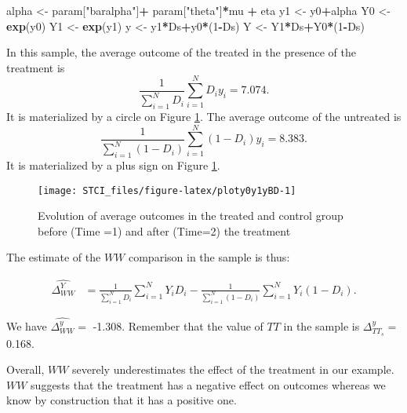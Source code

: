 \documentclass[]{book}
\newenvironment{Shaded}{\begin{snugshade}}{\end{snugshade}}
\newcommand{\KeywordTok}[1]{\textcolor[rgb]{0.13,0.29,0.53}{\textbf{#1}}}
\newcommand{\DecValTok}[1]{\textcolor[rgb]{0.00,0.00,0.81}{#1}}
\newcommand{\StringTok}[1]{\textcolor[rgb]{0.31,0.60,0.02}{#1}}
\newcommand{\OperatorTok}[1]{\textcolor[rgb]{0.81,0.36,0.00}{\textbf{#1}}}
\newcommand{\NormalTok}[1]{#1}
\theoremstyle{definition}
\theoremstyle{definition}
\theoremstyle{definition}
\theoremstyle{remark}
\begin{document}
\begin{Shaded}
\begin{Highlighting}[]
\NormalTok{alpha <-}\StringTok{ }\NormalTok{param[}\StringTok{"baralpha"}\NormalTok{]}\OperatorTok{+}\StringTok{  }\NormalTok{param[}\StringTok{"theta"}\NormalTok{]}\OperatorTok{*}\NormalTok{mu }\OperatorTok{+}\StringTok{ }\NormalTok{eta}
\NormalTok{y1 <-}\StringTok{ }\NormalTok{y0}\OperatorTok{+}\NormalTok{alpha}
\NormalTok{Y0 <-}\StringTok{ }\KeywordTok{exp}\NormalTok{(y0)}
\NormalTok{Y1 <-}\StringTok{ }\KeywordTok{exp}\NormalTok{(y1)}
\NormalTok{y <-}\StringTok{ }\NormalTok{y1}\OperatorTok{*}\NormalTok{Ds}\OperatorTok{+}\NormalTok{y0}\OperatorTok{*}\NormalTok{(}\DecValTok{1}\OperatorTok{-}\NormalTok{Ds)}
\NormalTok{Y <-}\StringTok{ }\NormalTok{Y1}\OperatorTok{*}\NormalTok{Ds}\OperatorTok{+}\NormalTok{Y0}\OperatorTok{*}\NormalTok{(}\DecValTok{1}\OperatorTok{-}\NormalTok{Ds)}
\end{Highlighting}
\end{Shaded}

In this sample, the average outcome of the treated in the presence of
the treatment is \[
\frac{1}{\sum_{i=1}^ND_i}\sum_{i=1}^ND_iy_i= 7.074.
\] It is materialized by a circle on Figure \ref{fig:ploty0y1yBD}. The
average outcome of the untreated is \[
\frac{1}{\sum_{i=1}^N(1-D_i)}\sum_{i=1}^N(1-D_i)y_i= 8.383.
\] It is materialized by a plus sign on Figure \ref{fig:ploty0y1yBD}.

\begin{figure}

{\centering \texttt{[image: STCI\_files/figure-latex/ploty0y1yBD-1]} 

}

\caption{Evolution of average outcomes in the treated and control group before (Time =1) and after (Time=2) the treatment}\label{fig:ploty0y1yBD}
\end{figure}

The estimate of the \(WW\) comparison in the sample is thus:

\begin{align*}
\hat{\Delta^Y_{WW}} & = \frac{1}{\sum_{i=1}^N D_i}\sum_{i=1}^N Y_iD_i-\frac{1}{\sum_{i=1}^N (1-D_i)}\sum_{i=1}^N Y_i(1-D_i).
\end{align*}

We have \(\hat{\Delta^y_{WW}}=\) -1.308. Remember that the value of
\(TT\) in the sample is \(\Delta^y_{TT_s}=\) 0.168.

Overall, \(WW\) severely underestimates the effect of the treatment in
our example. \(WW\) suggests that the treatment has a negative effect on
outcomes whereas we know by construction that it has a positive one.
\end{document}

